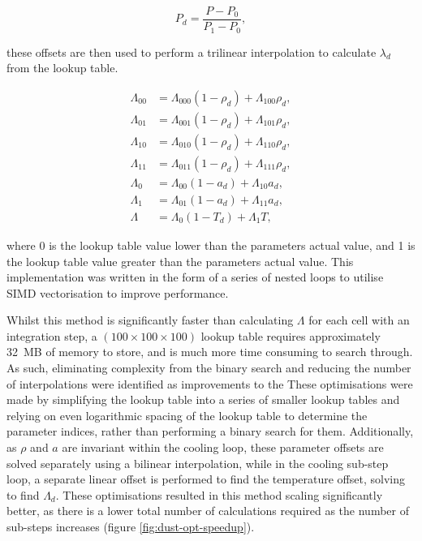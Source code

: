 \begin{equation}
  P_{d}=\frac{P-P_{0}}{P_{1}-P_{0}} , 
\end{equation}

\noindent
these offsets are then used to perform a trilinear interpolation to calculate $\lambda_d$ from the lookup table.

\begin{equation}
  \begin{split}
    \Lambda_{00} &=\Lambda_{000}\left(1-\rho_{d}\right)+\Lambda_{100} \rho_{d}, \\
    \Lambda_{01} &=\Lambda_{001}\left(1-\rho_{d}\right)+\Lambda_{101} \rho_{d}, \\
    \Lambda_{10} &=\Lambda_{010}\left(1-\rho_{d}\right)+\Lambda_{110} \rho_{d}, \\
    \Lambda_{11} &=\Lambda_{011}\left(1-\rho_{d}\right)+\Lambda_{111} \rho_{d}, \\
    \Lambda_{0} &=\Lambda_{00}\left(1-a_{d}\right)+\Lambda_{10} a_{d}, \\
    \Lambda_{1} &=\Lambda_{01}\left(1-a_{d}\right)+\Lambda_{11} a_{d}, \\
    \Lambda &=\Lambda_{0}\left(1-T_{d}\right)+\Lambda_{1} T,
  \end{split}
\end{equation}

\noindent
where 0 is the lookup table value lower than the parameters actual value, and 1 is the lookup table value greater than the parameters actual value.
This implementation was written in the form of a series of nested loops to utilise SIMD vectorisation to improve performance.


Whilst this method is significantly faster than calculating $\Lambda$ for each cell with an integration step, a $(100 \times 100 \times 100)$ lookup table requires approximately \SI{32}{\mega B} of memory to store, and is much more time consuming to search through.
As such, eliminating complexity from the binary search and reducing the number of interpolations were identified as improvements to the 
These optimisations were made by simplifying the lookup table into a series of smaller lookup tables and relying on even logarithmic spacing of the lookup table to determine the parameter indices, rather than performing a binary search for them.
Additionally, as $\rho$ and $a$ are invariant within the cooling loop, these parameter offsets are solved separately using a bilinear interpolation, while in the cooling sub-step loop, a separate linear offset is performed to find the temperature offset, solving to find $\Lambda_d$. These optimisations resulted in this method scaling significantly better, as there is a lower total number of calculations required as the number of sub-steps increases (figure \ref{fig:dust-opt-speedup}).

